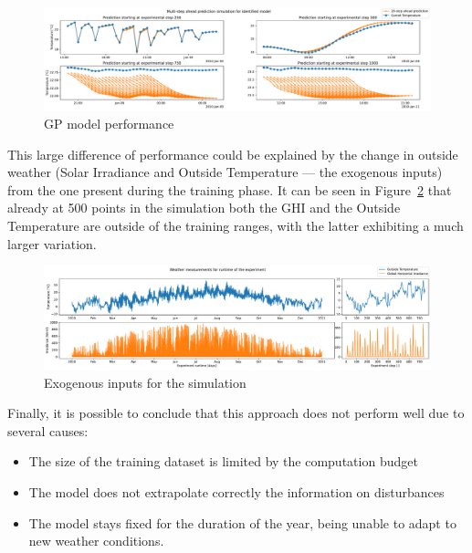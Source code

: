 \begin{figure}[ht]
    \centering
    \includegraphics[width =
    \textwidth]{Plots/4_GP_480pts_12_averageYear_first_model_performance.pdf}
    \caption{GP model performance}
    \label{fig:GP_first_model_performance}
\end{figure}

This large difference of performance could be explained by the change in outside
weather (Solar Irradiance and Outside Temperature --- the exogenous inputs) from
the one present during the training phase. It can be seen in
Figure~\ref{fig:Dataset_outside_temperature} that already at 500 points in the
simulation both the GHI and the Outside Temperature are outside of the training
ranges, with the latter exhibiting a much larger variation. 


\begin{figure}[ht]
    \centering
    \includegraphics[width =
    \textwidth]{Plots/Exogenous_inputs_fullyear.pdf}
    \caption{Exogenous inputs for the simulation}
    \label{fig:Dataset_outside_temperature}
\end{figure}

Finally, it is possible to conclude that this approach does not perform well due
to several causes:

\begin{itemize}
    \item The size of the training dataset is limited by the computation budget
    \item The model does not extrapolate correctly the information on
        disturbances
    \item The model stays fixed for the duration of the year, being unable to
        adapt to new weather conditions.
\end{itemize}

